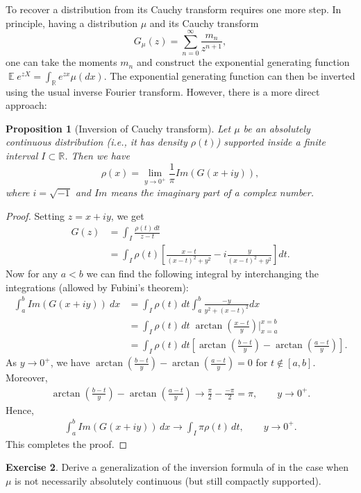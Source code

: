 \documentclass[letterpaper,11pt,oneside,reqno]{amsart}
\numberwithin{equation}{section}
\DeclareMathOperator{\EE}{\mathbb{E}}
\newtheorem{proposition}{Proposition}[section]
\theoremstyle{definition}
\newtheorem{exercise}[proposition]{Exercise}
\begin{document}
To recover a distribution from its Cauchy transform requires one more step. In principle, 
having a distribution $\mu$ and its Cauchy transform
\begin{equation}
	G_\mu(z)=\sum_{n=0}^{\infty}\frac{m_n}{z^{n+1}},
\end{equation}
one can take the moments $m_n$ and construct the exponential generating function $\EE e^{zX}=\int_{\mathbb{R}}e^{zx}\mu(dx)$.
The exponential generating function can then be inverted using the usual inverse Fourier transform.
However, there is a more direct approach:
\begin{proposition}[Inversion of Cauchy transform]\label{prop:inverse_Cauchy}
	Let $\mu$ be an absolutely continuous distribution (i.e., it has density $\rho(t)$) supported 
	inside a finite interval $I\subset\mathbb{R}$.
	Then we have 
	\begin{equation*}
		\rho(x)=\lim_{y\to0^{+}}\frac{1}{\pi}Im(G(x+iy)),
	\end{equation*}
	where $i=\sqrt{-1}$ and $Im$ means the imaginary part of a complex number.
\end{proposition}
\begin{proof}
	Setting $z=x+iy$, we get
	\begin{align*}
	 G(z)&=\int_I \frac{\rho(t)\, dt}{z-t}\\
	 &= \int_I \rho(t)\left[\frac{x-t}{(x-t)^2+y^2}-i\frac{y}{(x-t)^2+y^2}\right] dt.
	\end{align*}
	Now for any $a<b$ we can find the following integral
	by interchanging the integrations
	(allowed by Fubini's theorem):
	\begin{align*}
	 \int_a^b Im(G(x+iy)) \ dx&= \int_I\rho(t)\, dt\int_a^b \frac{-y}{y^2+(x-t)^2} dx\\
	 &=\int_I\rho(t)\, dt\;\arctan\left(\frac{x-t}{y}\right)\bigg\vert_{x=a}^{x=b}\\
	 &=\int_I\rho(t)\, dt\left[\arctan\left(\frac{b-t}{y}\right)-\arctan\left(\frac{a-t}{y}\right)\right].
	\end{align*}
	As $y\to0^+$, we have
	$\arctan\left(\frac{b-t}{y}\right)-\arctan\left(\frac{a-t}{y}\right)=0$ for $t\notin[a,b]$.
	Moreover, 
	\begin{align*}
	\arctan\left(\frac{b-t}{y}\right)-\arctan\left(\frac{a-t}{y}\right)\to \frac{\pi}{2}-\frac{-\pi}{2}=\pi,\qquad y\to0^+.
	\end{align*}
	Hence,
	\begin{align*}
	 \int_a^b Im(G(x+iy)) \, dx\to \int_I \pi\rho(t)\, dt,\qquad {y\to 0^+}.
	\end{align*}
	This completes the proof.
\end{proof}
\begin{exercise}
	Derive a generalization of the inversion formula of 
	in the case when $\mu$ is not necessarily absolutely continuous (but still compactly supported).
\end{exercise}
\end{document}
